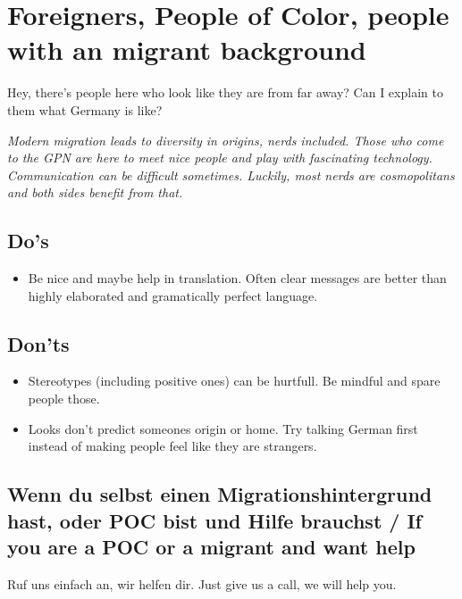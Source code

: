 \documentclass[10pt]{leaflet}
\begin{document}
\section{Foreigners, People of Color, people with an migrant background}

\label{sec-4}
Hey, there's people here who look like they are from far away? Can I
explain to them what Germany is like?

\emph{Modern migration leads to diversity in origins, nerds
  included. Those who come to the GPN are here to meet nice people and
  play with fascinating technology. Communication can be difficult
  sometimes. Luckily, most nerds are cosmopolitans and both sides
  benefit from that.}

\subsection{Do's}
\label{sec-4-1}
\begin{itemize}
\item Be nice and maybe help in translation. Often clear messages are
  better than highly elaborated and gramatically perfect language.
\end{itemize}
\subsection{Don'ts}
\label{sec-4-2}
\begin{itemize}
\item Stereotypes (including positive ones) can be hurtfull. Be
  mindful and spare people those.
\item Looks don't predict someones origin or home. Try talking German
  first instead of making people feel like they are strangers.
\end{itemize}
\subsection{Wenn du selbst einen Migrationshintergrund hast, oder POC bist  und  Hilfe brauchst / If you are a POC or a migrant and want help}
Ruf uns einfach an, wir helfen dir. Just give us a call, we will help
you.\\ \\ \\ \\  \\ \\ \\ \\ \\
\end{document}
